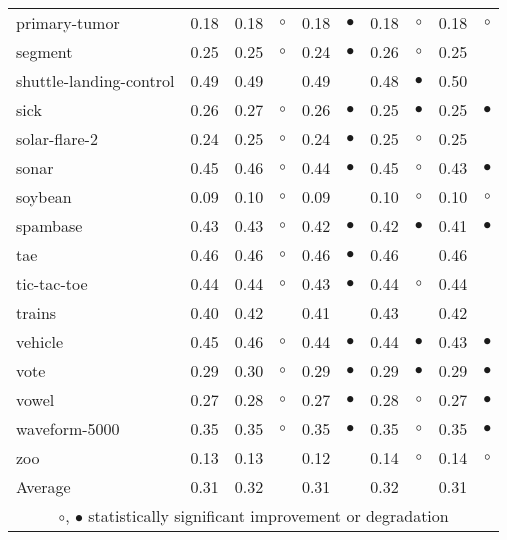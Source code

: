 \begin{table}[H]
{\begin{tabular}{lrr@{\hspace{0.1cm}}cr@{\hspace{0.1cm}}cr@{\hspace{0.1cm}}cr@{\hspace{0.1cm}}c}
primary-tumor & 0.18 & 0.18 &   $\circ$ & 0.18 & $\bullet$ & 0.18 &   $\circ$ & 0.18 &    $\circ$\\
segment & 0.25 & 0.25 &   $\circ$ & 0.24 & $\bullet$ & 0.26 &   $\circ$ & 0.25 &           \\
shuttle-landing-control & 0.49 & 0.49 &           & 0.49 &           & 0.48 & $\bullet$ & 0.50 &           \\
sick & 0.26 & 0.27 &   $\circ$ & 0.26 & $\bullet$ & 0.25 & $\bullet$ & 0.25 &  $\bullet$\\
solar-flare-2 & 0.24 & 0.25 &   $\circ$ & 0.24 & $\bullet$ & 0.25 &   $\circ$ & 0.25 &           \\
sonar & 0.45 & 0.46 &   $\circ$ & 0.44 & $\bullet$ & 0.45 &   $\circ$ & 0.43 &  $\bullet$\\
soybean & 0.09 & 0.10 &   $\circ$ & 0.09 &           & 0.10 &   $\circ$ & 0.10 &    $\circ$\\
spambase & 0.43 & 0.43 &   $\circ$ & 0.42 & $\bullet$ & 0.42 & $\bullet$ & 0.41 &  $\bullet$\\
tae & 0.46 & 0.46 &   $\circ$ & 0.46 & $\bullet$ & 0.46 &           & 0.46 &           \\
tic-tac-toe & 0.44 & 0.44 &   $\circ$ & 0.43 & $\bullet$ & 0.44 &   $\circ$ & 0.44 &           \\
trains & 0.40 & 0.42 &           & 0.41 &           & 0.43 &           & 0.42 &           \\
vehicle & 0.45 & 0.46 &   $\circ$ & 0.44 & $\bullet$ & 0.44 & $\bullet$ & 0.43 &  $\bullet$\\
vote & 0.29 & 0.30 &   $\circ$ & 0.29 & $\bullet$ & 0.29 & $\bullet$ & 0.29 &  $\bullet$\\
vowel & 0.27 & 0.28 &   $\circ$ & 0.27 & $\bullet$ & 0.28 &   $\circ$ & 0.27 &  $\bullet$\\
waveform-5000 & 0.35 & 0.35 &   $\circ$ & 0.35 & $\bullet$ & 0.35 &   $\circ$ & 0.35 &  $\bullet$\\
zoo & 0.13 & 0.13 &           & 0.12 &           & 0.14 &   $\circ$ & 0.14 &    $\circ$\\
\hline
Average & 0.31 & 0.32 &           & 0.31 &           & 0.32 &           & 0.31 &           \\
\hline
\multicolumn{10}{c}{$\circ$, $\bullet$ statistically significant improvement or degradation}\\
\end{tabular} \footnotesize \par}
\end{table}
